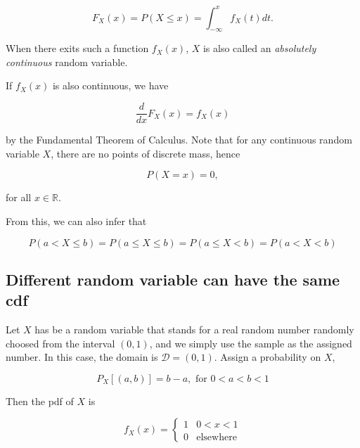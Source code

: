 \documentclass{article}
\begin{document}
            \begin{equation*}
                F_{X}(x) = P(X \leq x) = \int_{-\infty}^{x} f_{X}(t) dt.
            \end{equation*}

            When there exits such a function $ f_{X}(x) $, $ X $ is also called an
            \textit{absolutely continuous} random variable.

            If $ f_{X}(x) $ is also continuous, we have

            \begin{equation*}
                 \frac{d}{dx} F_{X}(x) = f_{X}(x)
            \end{equation*}

            by the Fundamental Theorem of Calculus. Note that for any continuous
            random variable $ X $, there are no points of discrete mass, hence

            \begin{equation*}
                 P(X = x) = 0,
            \end{equation*}

            for all $ x \in \mathbb{R} $.

            From this, we can also infer that

            \begin{equation*}
                 P ( a < X \leq b ) = P ( a \leq X \leq b) = P ( a \leq X < b)
                     = P ( a < X < b)
            \end{equation*}

        \subsection{Different random variable can have the same cdf}

            Let $ X $ has be a random variable that stands for a real
            random number randomly choosed from the interval $ (0, 1) $,
            and we simply use the sample as the assigned number. In this case,
            the domain is $ \mathcal{D} = (0, 1) $. Assign a probability on $ X $,

            \begin{equation*}
                P_{X}[(a, b)] = b - a, \text{ for } 0 < a < b < 1
            \end{equation*}

            Then the pdf of $ X $ is

            \begin{equation*}
                 f_{X}(x) =  \left\{
                     \begin{array}{ll}
                         1 & 0 < x < 1 \\
                         0 & \text{elsewhere}
                     \end{array}
                 \right.
            \end{equation*}
\end{document}
